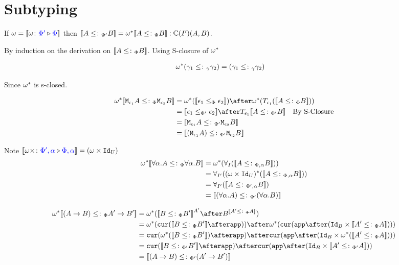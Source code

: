 \documentclass{report}
\begin{document}
\section{Subtyping}

If $\omega = {\bf [\![}\omega \colon {\color{blue}\Phi'} \triangleright {\color {blue} \Phi}{\bf ]\!]}$ then ${\bf [\![}A\leq\colon_{\Phi'} B{\bf ]\!]} = \omega^*{\bf [\![}A\leq\colon_\Phi B{\bf ]\!]}: \mathbb{C}(I')(A, B)$.

\proof
By induction on the derivation on ${\bf [\![}A\leq\colon_\Phi B{\bf ]\!]}$. Using S-closure of $\omega^*$ 

\begin{align*}
    \omega^*(\gamma_1\leq\colon_\gamma\gamma_2) &= (\gamma_1\leq\colon_\gamma\gamma_2)
\end{align*}

Since $\omega^*$ is s-closed.

\begin{align*}
    \w\star\deno{\M{\e_1}{A} \subtypep \M{\e_2}{B}} & = \w\star(\deno{\e_1\subeffectp\e_2})\after\w\star(\T{\e_1}(\deno{A\subtypep B})) \\ 
     &= \deno{\e_1\subeffectpp\e_2} \after \T{\e_1}{\deno{A\subtypepp B}}\qt{By S-Closure}\\
     &= \deno{\M{\e_1}{A}\subtypepp\M{\e_2}{B}}\\
     &= \deno{(\M{\e_1}{A})\subtypepp\M{\e_2}{B}}\\
\end{align*}

Note ${\bf [\![}\omega\times \colon {\color{blue}\Phi',\alpha} \triangleright {\color {blue} \Phi,\alpha}{\bf ]\!]} = (\omega\times\texttt{Id}_{U})$
    \begin{align*}
        \w\star\deno{\all{\a}{A}\subtypep\all{\a}{B}} &= \w\star(\allI(\deno{A\subtypepa B})) \\
        &=\allII((\w\times\Id{U})\star(\deno{A\subtypepa B}))\\
        &=\allII(\deno{A\subtypeppa B})\\
        &= \deno{(\all{\a}{A}) \subtypepp(\all{\a}{B})}\\
    \end{align*}

\begin{align*}
    \w\star\deno{(\ab)\subtypep\fntype{A'}{B'}} &= \w\star(\deno{B\subtypep B'}^{A'}\after B^{\deno{A'\subtypep A}})\\
    &= \w\star(\cur{\deno{B\subtypep B'}\after\app})\after\w\star(\cur{\app\after(\Id{B}\times\deno{A'\subtypep A})})\\
    & = \cur{\w\star(\deno{B\subtypep B'})\after\app}\after\cur{\app\after(\Id{B}\times\w\star(\deno{A'\subtypep A}))}\\
    & = \cur{\deno{B\subtypepp B'}\after\app}\after\cur{\app\after(\Id{B}\times\deno{A'\subtypepp A})}\\
    &= \deno{(\ab)\subtypepp(\fntype{A'}{B'})}
\end{align*}
\end{document}
